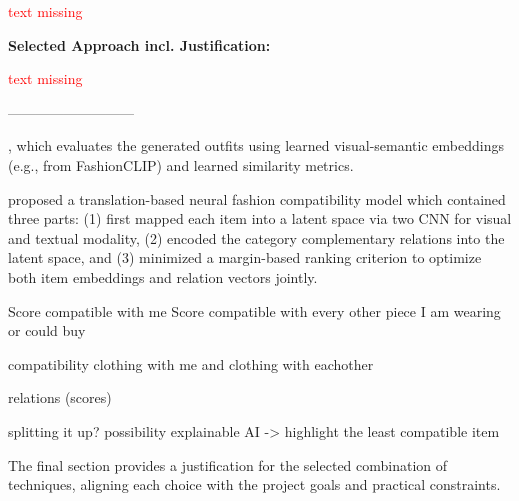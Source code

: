 \vspace{0.5cm}

\textcolor{red}{text missing}

\vspace{0.5cm}

\textbf{Selected Approach incl. Justification:}

\vspace{0.5cm}

\textcolor{red}{text missing}

---------------------------


, which evaluates the generated outfits using learned visual-semantic embeddings (e.g., from FashionCLIP) and learned similarity metrics.

proposed a translation-based neural fashion compatibility model which contained three parts: (1) first mapped each item into a latent space via two CNN for visual and textual modality, (2) encoded the category complementary relations into the latent space, and (3) minimized a margin-based ranking criterion to optimize both item embeddings and relation vectors jointly.

Score compatible with me
Score compatible with every other piece I am wearing or could buy

compatibility clothing with me and clothing with eachother



relations (scores)


splitting it up? possibility
explainable AI -> highlight the least compatible item


The final section provides a justification for the selected combination of techniques, aligning each choice with the project goals and practical constraints.